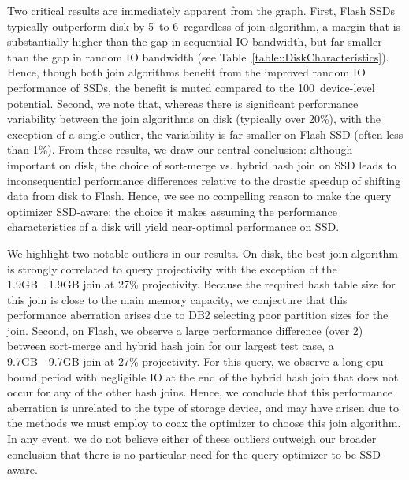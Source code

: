 Two critical results are immediately apparent from the graph.  
First, Flash SSDs typically outperform disk by 5\texttimes~to 6\texttimes~regardless of join algorithm, a margin that is substantially higher than the gap in sequential IO bandwidth, but far smaller than the gap in random IO bandwidth (see Table~\ref{table::DiskCharacteristics}).
Hence, though both join algorithms benefit from the improved random IO performance of SSDs, the benefit is muted compared to the 100\texttimes~device-level potential.
Second, we note that, whereas there is significant performance variability between the join algorithms on disk (typically over 20\%), with the exception of a single outlier, the variability is far smaller on Flash SSD (often less than 1\%).
From these results, we draw our central conclusion: although important on disk, the choice of sort-merge vs. hybrid hash join on SSD leads to inconsequential performance differences relative to the drastic speedup of shifting data from disk to Flash.
Hence, we see no compelling reason to make the query optimizer SSD-aware; the choice it makes assuming the performance characteristics of a disk will yield near-optimal performance on SSD.

We highlight two notable outliers in our results.
On disk, the best join algorithm is strongly correlated to query projectivity with the exception of the 1.9GB~\texttimes~1.9GB join at 27\% projectivity.
Because the required hash table size for this join is close to the main memory capacity, we conjecture that this performance aberration arises due to DB2 selecting poor partition sizes for the join.
Second, on Flash, we observe a large performance difference (over 2\texttimes) between sort-merge and hybrid hash join for our largest test case, a 9.7GB~\texttimes~9.7GB join at 27\% projectivity.
For this query, we observe a long cpu-bound period with negligible IO at the end of the hybrid hash join that does not occur for any of the other hash joins.
Hence, we conclude that this performance aberration is unrelated to the type of storage device, and may have arisen due to the methods we must employ to coax the optimizer to choose this join algorithm.
In any event, we do not believe either of these outliers outweigh our broader conclusion that there is no particular need for the query optimizer to be SSD aware.
